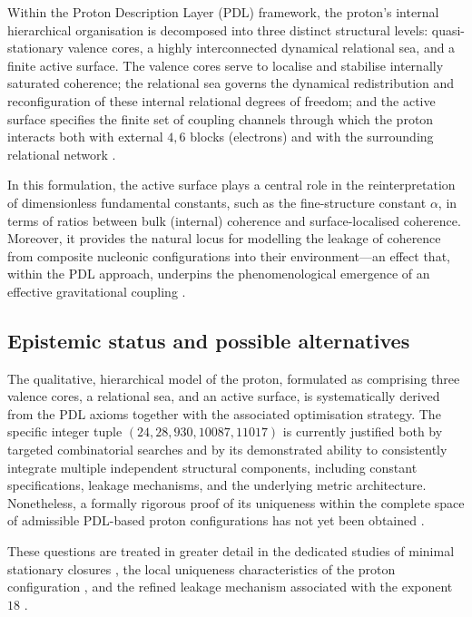 \documentclass[11pt,a4paper]{article}
\begin{document}
Within the Proton Description Layer (PDL) framework, the proton’s internal hierarchical organisation is decomposed into three distinct structural levels: quasi-stationary valence cores, a highly interconnected dynamical relational sea, and a finite active surface. The valence cores serve to localise and stabilise internally saturated coherence; the relational sea governs the dynamical redistribution and reconfiguration of these internal relational degrees of freedom; and the active surface specifies the finite set of coupling channels through which the proton interacts both with external \(4,6\) blocks (electrons) and with the surrounding relational network
\citep{PDL_Main_2026,Born_Golden_v2_2026}.

In this formulation, the active surface plays a central role in the reinterpretation of dimensionless fundamental constants, such as the fine-structure constant \(\alpha\), in terms of ratios between bulk (internal) coherence and surface-localised coherence. Moreover, it provides the natural locus for modelling the leakage of coherence from composite nucleonic configurations into their environment—an effect that, within the PDL approach, underpins the phenomenological emergence of an effective gravitational coupling
\citep{Alpha_PDL_v2_2026,Exponent_18_PDL_2026}.

\subsection{Epistemic status and possible alternatives}
\label{subsec:proton_status}

The qualitative, hierarchical model of the proton, formulated as comprising three valence cores, a relational sea, and an active surface, is systematically derived from the PDL axioms together with the associated optimisation strategy. The specific integer tuple \((24,28,930,10087,11017)\) is currently justified both by targeted combinatorial searches and by its demonstrated ability to consistently integrate multiple independent structural components, including constant specifications, leakage mechanisms, and the underlying metric architecture. Nonetheless, a formally rigorous proof of its uniqueness within the complete space of admissible PDL-based proton configurations has not yet been obtained
\citep{Combinatorial_Proton_v2_2026,PDL_position}.

These questions are treated in greater detail in the dedicated studies of minimal stationary closures \citep{Minimal_Stationary_Closures_2026}, the local uniqueness characteristics of the proton configuration \citep{Proton_Local_Uniqueness_2026,Combinatorial_Proton_v2_2026}, and the refined leakage mechanism associated with the exponent \(18\) \citep{Coherence_Leakage_18_2026,Exponent_18_PDL_2026}.
\end{document}
